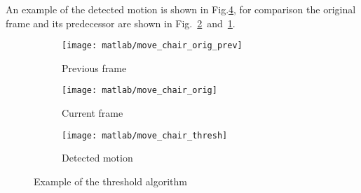 \documentclass[a4paper,oneside]{article}
\begin{document}
An example of the detected motion is shown in Fig.\ref{fig:thresh},
for comparison the original frame and its predecessor are shown in
Fig.~\ref{fig:thresh_orig}~and~\ref{fig:thresh_orig_prev}.
\begin{figure}[htbp]
  \centering
  \begin{subfigure}{0.3\textwidth}
    \centering
    \texttt{[image: matlab/move\_chair\_orig\_prev]}
    \caption{Previous frame}
    \label{fig:thresh_orig_prev}
  \end{subfigure}%
  \begin{subfigure}{0.3\textwidth}
    \centering
    \texttt{[image: matlab/move\_chair\_orig]}
    \caption{Current frame}
    \label{fig:thresh_orig}
  \end{subfigure}%
  \begin{subfigure}{0.3\textwidth}
    \centering
    \texttt{[image: matlab/move\_chair\_thresh]}
    \caption{Detected motion}
    \label{fig:thresh}
  \end{subfigure}%
  \caption{Example of the threshold algorithm}
\end{figure}
\end{document}
